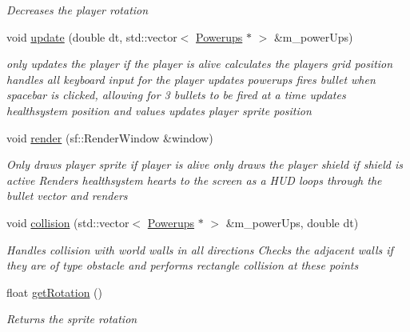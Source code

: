 \begin{DoxyCompactItemize}
\begin{DoxyCompactList}\small\item\em Decreases the player rotation \end{DoxyCompactList}\item 
void \mbox{\hyperlink{class_player_a825e707c1bf75f4488c11997be6adadc}{update}} (double dt, std\+::vector$<$ \mbox{\hyperlink{class_powerups}{Powerups}} $\ast$ $>$ \&m\+\_\+power\+Ups)
\begin{DoxyCompactList}\small\item\em only updates the player if the player is alive calculates the players grid position handles all keyboard input for the player updates powerups fires bullet when spacebar is clicked, allowing for 3 bullets to be fired at a time updates healthsystem position and values updates player sprite position \end{DoxyCompactList}\item 
void \mbox{\hyperlink{class_player_a53938857e80374e79726309e78d1c15c}{render}} (sf\+::\+Render\+Window \&window)
\begin{DoxyCompactList}\small\item\em Only draws player sprite if player is alive only draws the player shield if shield is active Renders healthsystem hearts to the screen as a H\+UD loops through the bullet vector and renders \end{DoxyCompactList}\item 
void \mbox{\hyperlink{class_player_a220b112385e59f3218c98a2e7842236d}{collision}} (std\+::vector$<$ \mbox{\hyperlink{class_powerups}{Powerups}} $\ast$ $>$ \&m\+\_\+power\+Ups, double dt)
\begin{DoxyCompactList}\small\item\em Handles collision with world walls in all directions Checks the adjacent walls if they are of type obstacle and performs rectangle collision at these points \end{DoxyCompactList}\item 
float \mbox{\hyperlink{class_player_aa2890f51b31e33f439f6bd67092168f7}{get\+Rotation}} ()
\begin{DoxyCompactList}\small\item\em Returns the sprite rotation \end{DoxyCompactList}\end{DoxyCompactItemize}
